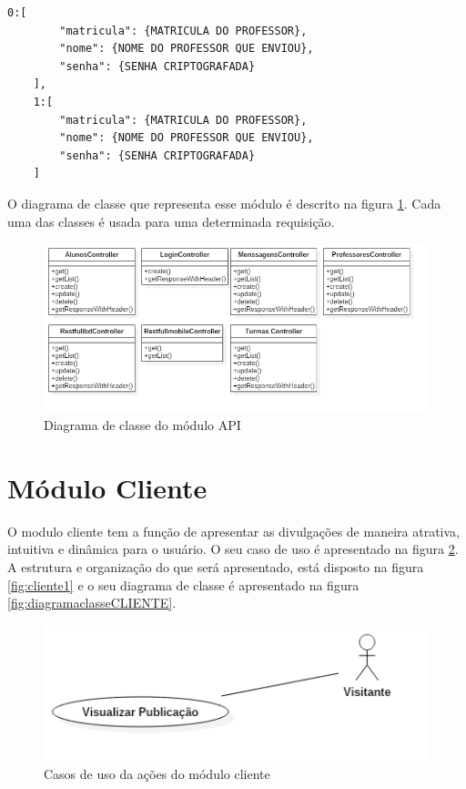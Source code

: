 \begin{lstlisting}[caption={Retorno da requisição \ref{lst:bd}},label={lst:retornoprofessores}]
	0:[
		"matricula": {MATRICULA DO PROFESSOR},
		"nome": {NOME DO PROFESSOR QUE ENVIOU},
		"senha": {SENHA CRIPTOGRAFADA}
	],
	1:[		
		"matricula": {MATRICULA DO PROFESSOR},
		"nome": {NOME DO PROFESSOR QUE ENVIOU},
		"senha": {SENHA CRIPTOGRAFADA}
	]
\end{lstlisting}

O diagrama de classe que representa esse módulo é descrito na figura \ref{fig:diagramaclasseAPI}. Cada uma das classes é usada para uma determinada requisição.
\begin{figure}[H]
\centering
\includegraphics[scale=0.5]{figuras/diagramaclasseAPI}
\caption{Diagrama de classe do módulo API}
\label{fig:diagramaclasseAPI}
\end{figure}

\section{Módulo Cliente}
\label{sec:cliente}
O modulo cliente tem a função de apresentar as divulgações de maneira atrativa, intuitiva e dinâmica para o usuário. O seu caso de uso é apresentado na figura \ref{fig:casosDeUsoCliente}. A estrutura e organização do que será apresentado, está disposto na figura \ref{fig:cliente1} e o seu diagrama de classe é apresentado na figura \ref{fig:diagramaclasseCLIENTE}.

\begin{figure}[H]
\centering
\includegraphics[scale=0.6]{figuras/CasosDeUsoCliente}
\caption{Casos de uso da ações do módulo cliente}
\label{fig:casosDeUsoCliente}
\end{figure} 

